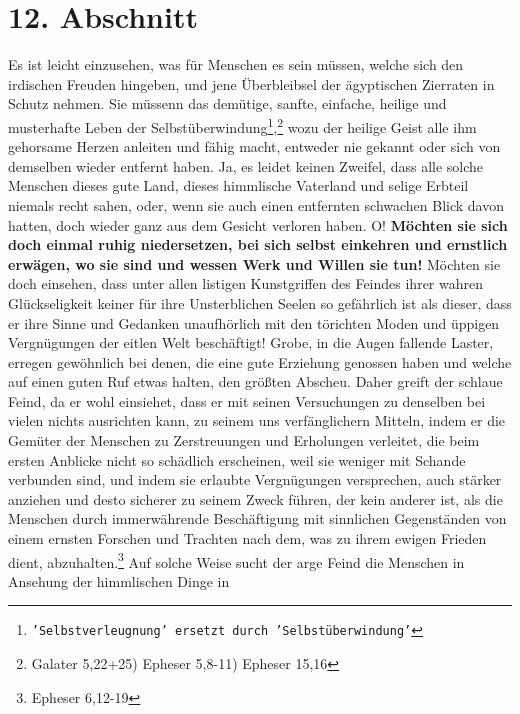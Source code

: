 {\section{12. Abschnitt} \label{kap17_ab12}

Es ist leicht einzusehen, was für Menschen es sein müssen, welche sich den
irdischen Freuden hingeben, und jene Überbleibsel der ägyptischen Zierraten in
Schutz nehmen. Sie müssenn das demütige, sanfte, einfache, heilige und
musterhafte Leben der Selbstüberwindung\footnote{\texttt{'Selbstverleugnung'
ersetzt durch
'Selbstüberwindung'}},\footnote{Galater 5,22+25) Epheser 5,8-11)
Epheser 15,16}
wozu der heilige Geist alle ihm gehorsame Herzen anleiten und fähig
macht, entweder nie gekannt oder sich von demselben wieder entfernt haben. Ja,
es leidet keinen Zweifel, dass alle solche Menschen dieses gute Land, dieses
himmlische Vaterland und selige Erbteil niemals recht sahen, oder, wenn sie auch
einen entfernten schwachen Blick davon hatten, doch wieder ganz aus dem Gesicht
verloren haben. O! \label{ref:17_12_einkehr}\textbf{Möchten sie sich doch einmal
ruhig niedersetzen, bei sich
selbst
einkehren und ernstlich erwägen, wo sie sind und wessen Werk und Willen sie
tun!} Möchten sie doch einsehen, dass unter allen listigen Kunstgriffen des
Feindes ihrer wahren Glückseligkeit keiner für ihre Unsterblichen Seelen so
gefährlich ist als dieser, dass er ihre Sinne und Gedanken unaufhörlich mit den
törichten Moden und üppigen Vergnügungen der eitlen Welt beschäftigt! Grobe, in
die Augen fallende Laster, erregen gewöhnlich bei denen, die eine gute Erziehung
genossen haben und welche auf einen guten Ruf etwas halten, den größten
Abscheu. Daher greift der schlaue Feind, da er wohl einsiehet, dass er mit
seinen
Versuchungen zu denselben bei vielen nichts ausrichten kann, zu seinem uns
verfänglichern Mitteln, indem er die Gemüter der Menschen zu Zerstreuungen und
Erholungen verleitet, die beim ersten Anblicke nicht so schädlich erscheinen,
weil sie weniger mit Schande verbunden sind, und indem sie erlaubte Vergnügungen
versprechen, auch stärker anziehen und desto sicherer zu seinem Zweck führen,
der kein anderer ist, als die Menschen durch immerwährende Beschäftigung mit
sinnlichen Gegenständen von einem ernsten Forschen und Trachten nach dem, was zu
ihrem ewigen Frieden dient, abzuhalten.\footnote{Epheser 6,12-19}
Auf solche
Weise sucht der arge Feind die Menschen in Ansehung der himmlischen Dinge in
}
